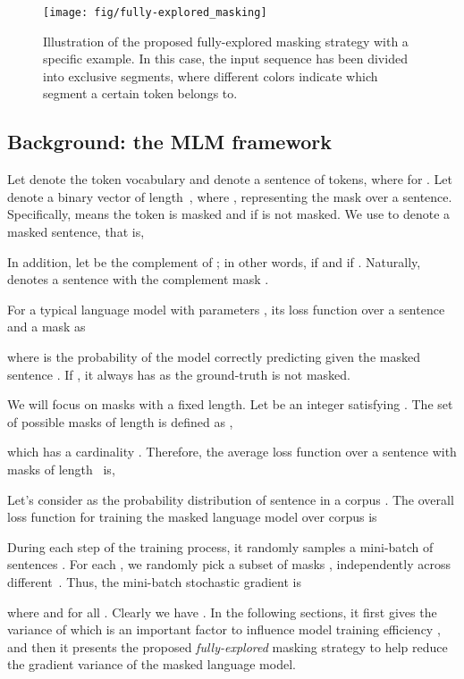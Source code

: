 \documentclass{article} \usepackage{iclr2021_conference,times}
\theoremstyle{plain}
\begin{document}
\begin{figure*}
	\centering
	\texttt{[image: fig/fully-explored\_masking]}
	\vspace{-2mm}
	\caption{Illustration of the proposed fully-explored masking strategy with a specific example. In this case, the input sequence has been divided into  exclusive segments, where different colors indicate which segment a certain token belongs to. }
	\vspace{-2mm}
	\label{fig:fully-explored_masking}
	\vspace{-2mm}
\end{figure*}

\vspace{-2mm}
\subsection{Background: the MLM framework}
\vspace{-2mm}
Let  denote the token vocabulary and  denote a sentence of  tokens, where  for .
Let  denote a binary vector of length~, where , representing the mask over a sentence. 
Specifically,  means the token  is masked and  if  is not masked.
We use  to denote a masked sentence, that is,

In addition, let  be the complement of ; in other words,  if  and  if . Naturally,  denotes a sentence with the complement mask . 

For a typical language model with parameters , its loss function over a sentence  and a mask  as

where  is the probability of the model correctly predicting  given the masked sentence . If , it always has  as the ground-truth  is not masked.   

We will focus on masks with a fixed length. Let  be an integer satisfying . The set of possible masks of length  is defined as  ,

which has a cardinality .
Therefore, the average loss function over a sentence  with masks of length~ is,

Let's consider  as the probability distribution of sentence in a corpus . 
The overall loss function for training the masked language model over corpus  is

During each step of the training process, it randomly samples a mini-batch of sentences .
For each , we randomly pick a subset of masks , independently across different~. Thus, the mini-batch stochastic gradient is


where  and  for all .
Clearly we have . In the
following sections, it first gives the variance of  which is an important factor to influence model training efficiency \citep{xiao2014proximal, zhang2019stochastic}, and then it presents the proposed \emph{fully-explored} masking strategy to help reduce the gradient variance of the masked language model.
\end{document}
